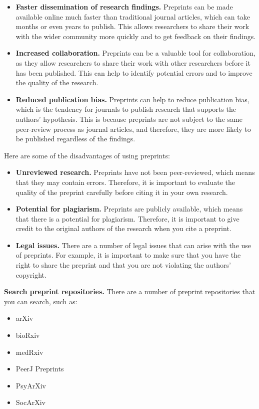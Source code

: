 \documentclass[
  b5paper]{book}
\begin{document}
\begin{itemize}
\item
  \textbf{Faster dissemination of research findings.} Preprints can be made available online much faster than traditional journal articles, which can take months or even years to publish. This allows researchers to share their work with the wider community more quickly and to get feedback on their findings.
\item
  \textbf{Increased collaboration.} Preprints can be a valuable tool for collaboration, as they allow researchers to share their work with other researchers before it has been published. This can help to identify potential errors and to improve the quality of the research.
\item
  \textbf{Reduced publication bias.} Preprints can help to reduce publication bias, which is the tendency for journals to publish research that supports the authors' hypothesis. This is because preprints are not subject to the same peer-review process as journal articles, and therefore, they are more likely to be published regardless of the findings.
\end{itemize}

Here are some of the disadvantages of using preprints:

\begin{itemize}
\item
  \textbf{Unreviewed research.} Preprints have not been peer-reviewed, which means that they may contain errors. Therefore, it is important to evaluate the quality of the preprint carefully before citing it in your own research.
\item
  \textbf{Potential for plagiarism.} Preprints are publicly available, which means that there is a potential for plagiarism. Therefore, it is important to give credit to the original authors of the research when you cite a preprint.
\item
  \textbf{Legal issues.} There are a number of legal issues that can arise with the use of preprints. For example, it is important to make sure that you have the right to share the preprint and that you are not violating the authors' copyright.
\end{itemize}

\textbf{Search preprint repositories.} There are a number of preprint repositories that you can search, such as:

\begin{itemize}
\item
  arXiv
\item
  bioRxiv
\item
  medRxiv
\item
  PeerJ Preprints
\item
  PsyArXiv
\item
  SocArXiv
\end{itemize}
\end{document}
